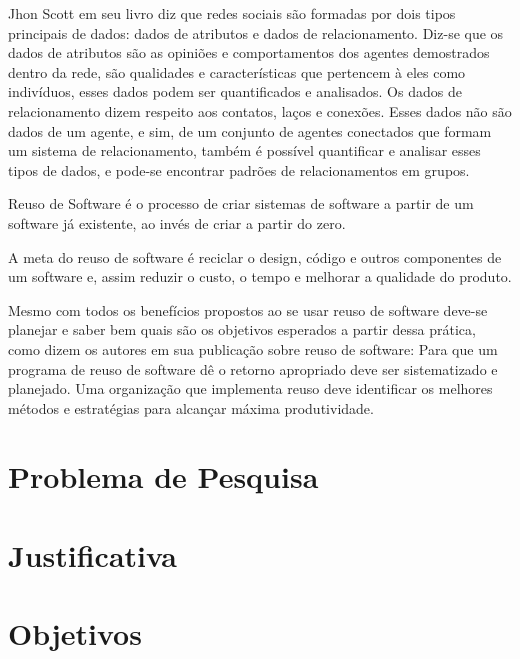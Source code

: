 Jhon Scott em seu livro \cite{Scott:Carrington:2011} diz que redes sociais são formadas por dois tipos principais de dados: dados de atributos e dados de relacionamento. Diz-se que os dados de atributos são as opiniões e comportamentos dos agentes demostrados dentro da rede, são qualidades e características que pertencem à eles como indivíduos, esses dados podem ser quantificados e analisados. Os dados de relacionamento dizem respeito aos contatos, laços e conexões. Esses dados não são dados de um agente, e sim, de um conjunto de agentes conectados que formam um sistema de relacionamento, também é possível quantificar e analisar esses tipos de dados, e pode-se encontrar padrões de relacionamentos em grupos.

Reuso de Software é o processo de criar sistemas de software a partir de um software já existente, ao invés de criar a partir do zero.\cite{Krueger:1992}

A meta do reuso de software é reciclar o design, código e outros componentes de um software e, assim reduzir o custo, o tempo e melhorar a qualidade do produto.\cite{Keswani:Joshi:Jatain:2014}

Mesmo com todos os benefícios propostos ao se usar reuso de software deve-se planejar e saber bem quais são os objetivos esperados a partir dessa prática, como dizem os autores em sua publicação sobre reuso de software: Para que um programa de reuso de software dê o retorno apropriado deve ser sistematizado e planejado. Uma organização que implementa reuso deve identificar os melhores métodos e estratégias para alcançar máxima produtividade.\cite{Keswani:Joshi:Jatain:2014}

\section*{Problema de Pesquisa}

\section*{Justificativa}

\section*{Objetivos}

